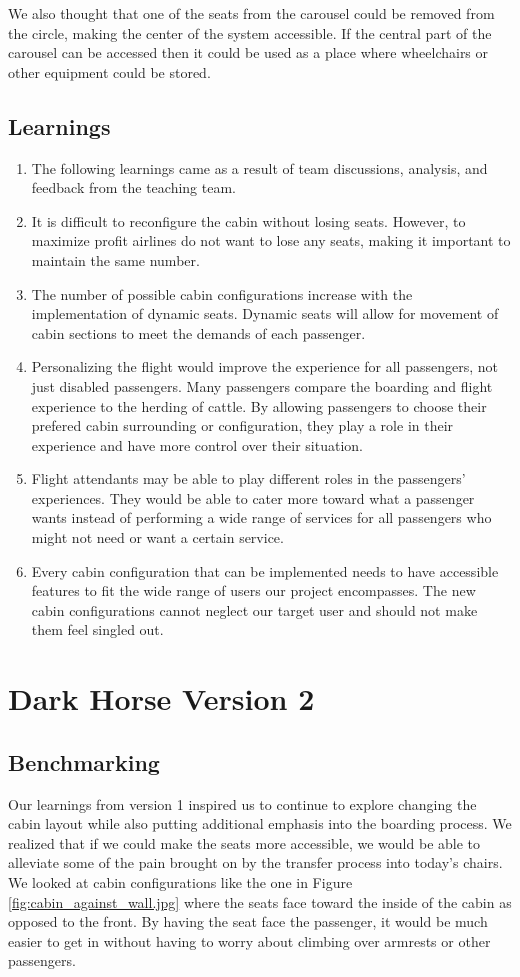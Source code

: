 We also thought that one of the seats from the carousel could be removed from the circle, making the center of the system accessible. If the central part of the carousel can be accessed then it could be used as a place where wheelchairs or other equipment could be stored.


\subsection{Learnings}
\begin{enumerate}
	\item The following learnings came as a result of team discussions, analysis, and feedback from the teaching team. 
	\item It is difficult to reconfigure the cabin without losing seats. However, to maximize profit airlines do not want to lose any seats, making it important to maintain the same number.
	\item The number of possible cabin configurations increase with the implementation of dynamic seats.  Dynamic seats will allow for movement of cabin sections to meet the demands of each passenger. 
	\item Personalizing the flight would improve the experience for all passengers, not just disabled passengers. Many passengers compare the boarding and flight experience to the herding of cattle. By allowing passengers to choose their prefered cabin surrounding or configuration, they play a role in their experience and have more control over their situation. 
	\item Flight attendants may be able to play different roles in the passengers' experiences.  They would be able to cater more toward what a passenger wants instead of performing a wide range of services for all passengers who might not need or want a certain service. 
	\item Every cabin configuration that can be implemented needs to have accessible features to fit the wide range of users our project encompasses.  The new cabin configurations cannot neglect our target user and should not make them feel singled out. 
\end{enumerate}

\section{Dark Horse Version 2}
\subsection{Benchmarking}
Our learnings from version 1 inspired us to continue to explore changing the cabin layout while also putting additional emphasis into the boarding process. We realized that if we could make the seats more accessible, we would be able to alleviate some of the pain brought on by the transfer process into today's chairs. We looked at cabin configurations like the one in Figure \ref{fig:cabin_against_wall.jpg} where the seats face toward the inside of the cabin as opposed to the front. By having the seat face the passenger, it would be much easier to get in without having to worry about climbing over armrests or other passengers. 

